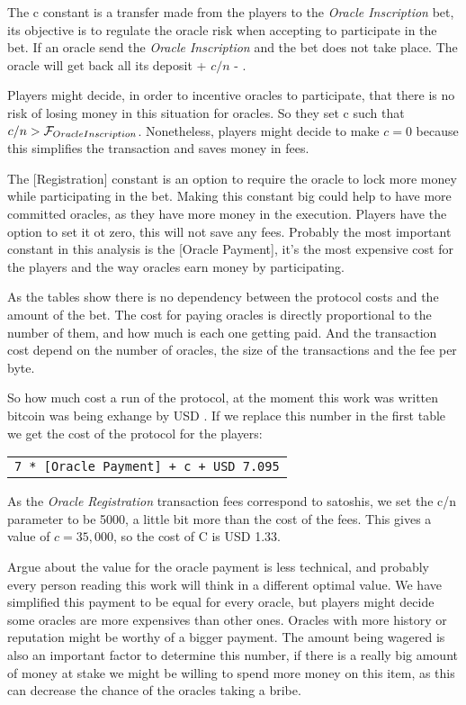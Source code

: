 The c constant is a transfer made from the players to the
  \textit{Oracle Inscription} bet, its objective is to regulate the oracle
  risk when accepting to participate in the bet.
If an oracle send the \textit{Oracle Inscription} and the bet does not take
  place. The oracle will get back all its deposit + $c/n$ -
  .

Players might decide, in order to incentive oracles to participate, that there
  is no risk of losing money in this situation for oracles. So they set c such
  that $c/n > \mathcal{F}_{OracleInscription}$.
Nonetheless, players might decide to make $c = 0$ because this simplifies the
  transaction and saves money in fees.

The [Registration] constant is an option to require the oracle to lock more
  money while participating in the bet.
Making this constant big could help to have more committed oracles, as they
  have more money in the execution.
Players have the option to set it ot zero, this will not save any fees.
Probably the most important constant in this analysis is the [Oracle Payment],
  it's the most expensive cost for the players and the way oracles earn money
  by participating.

As the tables show there is no dependency between the protocol costs and the
  amount of the bet.
The cost for paying oracles is directly proportional to the number of them, and
  how much is each one getting paid.
And the transaction cost depend on the number of oracles, the size of the
  transactions and the fee per byte.

So how much cost a run of the protocol, at the moment this work was written
  bitcoin was being exhange by USD \bitcoinusd{}. If we replace this number
  in the first table we get the cost of the protocol for the players:
\begin{center}
    \begin{tabular}{|c|}
        \texttt{7 * [Oracle Payment] + c + USD 7.095}
    \end{tabular}
\end{center}

As the \textit{Oracle Registration} transaction fees correspond to
  \mbox{} satoshis, we set the c/n parameter to be 5000, a
  little bit more than the cost of the fees.
This gives a value of $c = 35,000$, so the cost of C is USD 1.33.

Argue about the value for the oracle payment is less technical, and probably
  every person reading this work will think in a different optimal value.
We have simplified this payment to be equal for every oracle, but players
  might decide some oracles are more expensives than other ones.
Oracles with more history or reputation might be worthy of a bigger payment.
The amount being wagered is also an important factor to determine this number,
  if there is a really big amount of money at stake we might be willing to
  spend more money on this item, as this can decrease the chance of the oracles
  taking a bribe.

